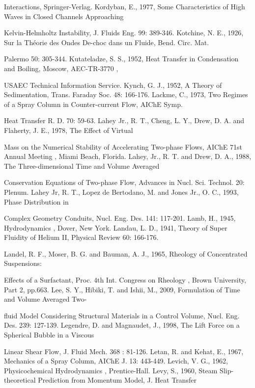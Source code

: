 \documentclass[11pt,a4paper,openany,fontset=none]{ctexbook}
\begin{document}
{\small\raggedright\noindent Interactions, Springer-Verlag. Kordyban, E., 1977, Some Characteristics of High Waves in Closed Channels Approaching\par}
{\small\raggedright\noindent Kelvin-Helmholtz Instability, J. Fluids Eng. 99: 389-346. Kotchine, N. E., 1926, Sur la Théorie des Ondes De-choc dans un Fluide, Bend. Circ. Mat.\par}
{\small\raggedright\noindent Palermo 50: 305-344. Kutateladze, S. S., 1952, Heat Transfer in Condensation and Boiling, Moscow, AEC-TR-3770 ,\par}
{\small\raggedright\noindent USAEC Technical Information Service. Kynch, G. J., 1952, A Theory of Sedimentation, Trans. Faraday Soc. 48: 166-176. Lackme, C., 1973, Two Regimes of a Spray Column in Counter-current Flow, AIChE Symp.\par}
{\small\raggedright\noindent Heat Transfer R. D. 70: 59-63. Lahey Jr., R. T., Cheng, L. Y., Drew, D. A. and Flaherty, J. E., 1978, The Effect of Virtual\par}
{\small\raggedright\noindent Mass on the Numerical Stability of Accelerating Two-phase Flows, AIChE 71st Annual Meeting , Miami Beach, Florida. Lahey, Jr., R. T. and Drew, D. A., 1988, The Three-dimensional Time and Volume Averaged\par}
{\small\raggedright\noindent Conservation Equations of Two-phase Flow, Advances in Nucl. Sci. Technol. 20: Plenum. Lahey Jr, R. T., Lopez de Bertodano, M. and Jones Jr., O. C., 1993, Phase Distribution in\par}
{\small\raggedright\noindent Complex Geometry Conduits, Nucl. Eng. Des. 141: 117-201. Lamb, H., 1945, Hydrodynamics , Dover, New York. Landau, L. D., 1941, Theory of Super Fluidity of Helium II, Physical Review 60: 166-176.\par}
{\small\raggedright\noindent Landel, R. F., Moser, B. G. and Bauman, A. J., 1965, Rheology of Concentrated Suspensions:\par}
{\small\raggedright\noindent Effects of a Surfactant, Proc. 4th Int. Congress on Rheology , Brown University, Part 2, pp.663. Lee, S. Y., Hibiki, T. and Ishii, M., 2009, Formulation of Time and Volume Averaged Two-\par}
{\small\raggedright\noindent fluid Model Considering Structural Materials in a Control Volume, Nucl. Eng. Des. 239: 127-139. Legendre, D. and Magnaudet, J., 1998, The Lift Force on a Spherical Bubble in a Viscous\par}
{\small\raggedright\noindent Linear Shear Flow, J. Fluid Mech. 368 : 81-126. Letan, R. and Kehat, E., 1967, Mechanics of a Spray Column, AIChE J. 13: 443-449. Levich, V. G., 1962, Physicochemical Hydrodynamics , Prentice-Hall. Levy, S., 1960, Steam Slip-theoretical Prediction from Momentum Model, J. Heat Transfer\par}
\end{document}
